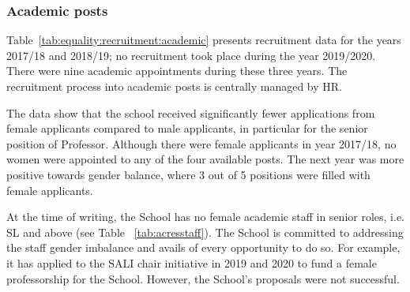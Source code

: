 \subsubsection{Academic posts}
Table~\ref{tab:equality:recruitment:academic} presents recruitment data for the years 2017/18 and 2018/19; no recruitment took place during the year 2019/2020. 
There were nine academic appointments during these three years.
The recruitment process into academic posts is centrally managed by \ac{HR}. %

The data show that the school received significantly fewer applications from female applicants compared to male applicants, in particular for the senior position of Professor. 
Although there were female applicants in year 2017/18, no women were appointed to any of the four available posts. 
The next year was more positive towards gender balance, where 3 out of 5 positions were filled with female applicants. 






At the time of writing, the School has no female academic staff in senior roles, i.e. \ac{SL} and above (see Table~ \ref{tab:acresstaff}). 
%
The School is committed to addressing the staff gender imbalance and avails of every opportunity to do so. For example, it has applied to the \ac{SALI} chair initiative in 2019 and 2020 to fund a female professorship for the School. However, the School's proposals were not successful. 


